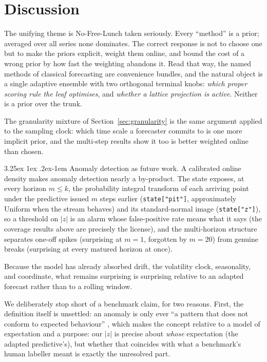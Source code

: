 \documentclass[article]{jss}
\makeatletter
\renewcommand\paragraph{\@startsection{paragraph}{4}{\z@}%
  {3.25ex \@plus1ex \@minus.2ex}{-1em}%
  {\normalfont\normalsize\itshape}}
\providecommand{\code}[1]{\texttt{#1}}
\makeatother
\begin{document}
\section{Discussion} \label{sec:discussion}

The unifying theme is No-Free-Lunch \citep{wolpert1997no} taken seriously. Every
``method'' is a prior; averaged over all series none dominates. The correct
response is not to choose one but to make the priors explicit, weight them online,
and bound the cost of a wrong prior by how fast the weighting abandons it. Read
that way, the named methods of classical forecasting are convenience bundles, and
the natural object is a single adaptive ensemble with two orthogonal terminal
knobs: \emph{which proper scoring rule the leaf optimises}, and \emph{whether a
lattice projection is active}. Neither is a prior over the trunk.

The
granularity mixture of Section~\ref{sec:granularity} is the same argument applied
to the sampling clock: which time scale a forecaster commits to is one more
implicit prior, and the multi-step results show it too is better weighted online
than chosen.

\paragraph{Anomaly detection as future work.}
A calibrated online density makes anomaly detection nearly a by-product. The
state exposes, at every horizon $m \le k$, the probability integral transform
of each arriving point under the predictive issued $m$ steps earlier
(\code{state["pit"]}, approximately Uniform when the stream behaves) and its
standard-normal image (\code{state["z"]}), so a threshold on $|z|$ is an alarm
whose false-positive rate means what it says (the coverage results above are
precisely the license), and the multi-horizon structure separates one-off
spikes (surprising at $m=1$, forgotten by $m=20$) from genuine breaks
(surprising at every matured horizon at once).

Because the model has already
absorbed drift, the volatility clock, seasonality, and coordinate, what remains
surprising is surprising relative to an adapted forecast rather than to a
rolling window.

We deliberately stop short of a benchmark claim, for two reasons.
First, the definition itself is unsettled: an anomaly is only ever ``a pattern
that does not conform to expected behaviour'' \citep{chandola2009anomaly},
which makes the concept relative to a model of expectation and a purpose:
our $|z|$ is precise about \emph{whose} expectation (the adapted predictive's),
but whether that coincides with what a benchmark's human labeller meant is
exactly the unresolved part.
\end{document}
